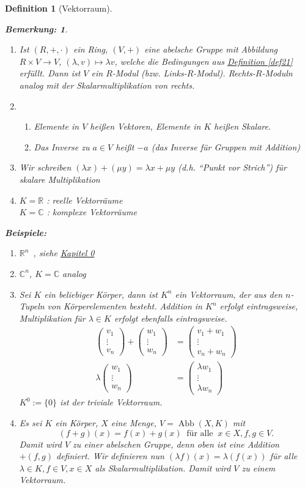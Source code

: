 \documentclass{report}
\newcommand{\lb}{\lambda}
\newcommand{\R}{\mathbb{R}}
\newcommand{\C}{\mathbb{C}}
\newcommand{\mRn}{$\mathbb{R}^n$\ }
\newcommand{\ve}[1]{{\begin{pmatrix}#1 \end{pmatrix}}}
\renewcommand{\v}{\ve}
\DeclareMathOperator{\abb}{Abb}
\theoremstyle{customrem}
\newtheorem*{bem}{Bemerkung:}
\theoremstyle{customdef}
\newtheorem{definition}{Definition}[chapter]
\begin{document}
\begin{definition}[Vektorraum]
		\begin{bem}$ $
			\begin{enumerate}
				\item Ist $(R, +, \cdot)$ ein Ring, $(V, +)$ eine abelsche Gruppe mit Abbildung $R \times V \to V$, $(\lb, v) \mapsto \lb v$, welche die Bedingungen aus \hyperref[def21]{Definition \ref{def21}} erfüllt. Dann ist $V$ ein $R$-Modul (bzw. Links-$R$-Modul).	Rechts-$R$-Moduln analog mit der Skalarmultiplikation von rechts.
				\item
					\begin{enumerate}
						\item Elemente in $V$ heißen Vektoren, Elemente in $K$ heißen Skalare.
						\item Das Inverse zu $a \in V$ heißt $-a$ (das Inverse für Gruppen mit Addition)
					\end{enumerate}
				\item Wir schreiben $(\lb x) + (\mu y) = \lb x + \mu y$ (d.h. "`Punkt vor Strich"') für skalare Multiplikation
				\item
					$K = \R$ : reelle Vektorräume\\
					$K = \C$ : komplexe Vektorräume
			\end{enumerate}
		\end{bem}
		\noindent
		\textbf{Beispiele:}
		\begin{enumerate}
			\item \mRn, siehe \hyperref[kap0]{Kapitel 0}
			\item $\C^n$, $K = \C$ analog
			\item Sei $K$ ein beliebiger Körper, dann ist $K^n$ ein Vektorraum, der aus den $n$-Tupeln von Körperelementen besteht. Addition in $K^n$ erfolgt eintragsweise, Multiplikation für $\lb \in K$ erfolgt ebenfalls eintragsweise.
			\begin{align*}
				\v{v_1\\ \vdots\\ v_n} + \v{w_1\\ \vdots\\ w_n} &= \v{v_1 + w_1\\ \vdots \\ v_n + w_n}\\[1em]
				\lb \v{w_1\\ \vdots\\ w_n} &= \v{\lb w_1\\ \vdots \\ \lb w_n}
			\end{align*}
			$K^0 := \{0\}$ ist der triviale Vektorraum.
			\item Es sei $K$ ein Körper, $X$ eine Menge, $V = \abb(X, K)$ mit
				$$(f + g)(x) = f(x) + g(x)\ \text{ für alle }\ x \in X, f, g \in V.$$
				Damit wird $V$ zu einer abelschen Gruppe, denn oben ist eine Addition $+(f, g)$ definiert. Wir definieren nun $(\lb f)(x) = \lb (f(x))$ für alle $\lb \in K, f \in V, x \in X$ als Skalarmultiplikation. Damit wird $V$ zu einem Vektorraum.
		\end{enumerate}
	\end{definition}
\end{document}
